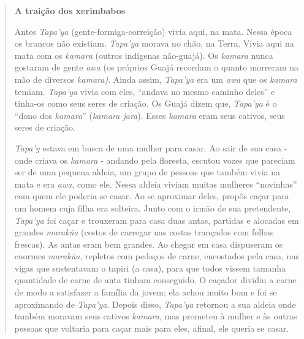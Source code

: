 \begin{quote}
\textbf{A traição dos xerimbabos}

Antes \emph{Tapa'ya} (gente-formiga-correição) vivia aqui, na mata.
Nessa época os brancos não existiam. \emph{Tapa'ya} morava no chão, na
Terra. Vivia aqui na mata com os \emph{kamara} (outros indígenas
não-guajá). Os \emph{kamara} nunca gostaram de gente \emph{awa} (os
próprios Guajá recordam o quanto morreram na mão de diversos
\emph{kamara)}. Ainda assim, \emph{Tapa'ya} era um \emph{awa} que os
\emph{kamara} temiam. \emph{Tapa'ya} vivia com eles, ``andava no mesmo
caminho deles'' e tinha-os como seus seres de criação. Os Guajá dizem
que, \emph{Tapa'ya} é o ``dono dos \emph{kamara}'' (\emph{kamara jara}).
Esses \emph{kamara} eram seus cativos, seus seres de criação.

\emph{Tapa'y} estava em busca de uma mulher para casar. Ao sair de sua
casa - onde criava os \emph{kamara} - andando pela floresta, escutou
vozes que pareciam ser de uma pequena aldeia, um grupo de pessoas que
também vivia na mata e era \emph{awa}, como ele. Nessa aldeia viviam
muitas mulheres ``novinhas'' com quem ele poderia se casar. Ao se
aproximar deles, propôs caçar para um homem cuja filha era solteira.
Junto com o irmão de sua pretendente, \emph{Tapa'ya} foi caçar e
trouxeram para casa duas antas, partidas e alocadas em grandes
\emph{marakũa} (cestos de carregar nas costas trançados com folhas
frescas). As antas eram bem grandes. Ao chegar em casa dispuseram os
enormes \emph{marakũa}, repletos com pedaços de carne, encostados pela
casa, nas vigas que sustentavam o tapiri (a casa), para que todos vissem
tamanha quantidade de carne de anta tinham conseguido. O caçador dividiu
a carne de modo a satisfazer a família da jovem; ela achou muito bom e
foi se aproximando de \emph{Tapa'ya}. Depois disso, \emph{Tapa'ya}
retornou a sua aldeia onde também moravam seus cativos \emph{kamara},
mas prometeu à mulher e às outras pessoas que voltaria para caçar mais
para eles, afinal, ele queria se casar.


\end{quote}
